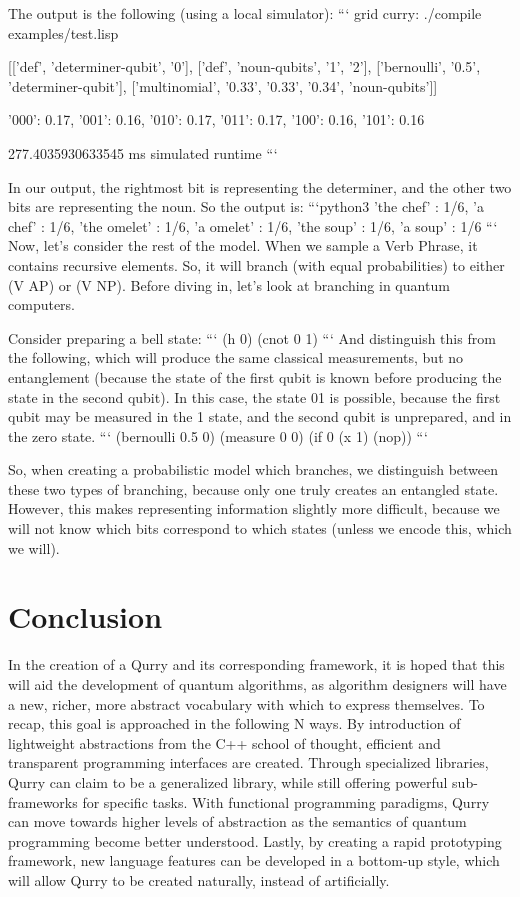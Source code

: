 \documentclass[journal]{article}
\begin{document}
 The output is the following (using a local simulator):
 ```
 grid {curry}: ./compile examples/test.lisp
 
 [['def', 'determiner-qubit', '0'],
  ['def', 'noun-qubits', '1', '2'],
  ['bernoulli', '0.5', 'determiner-qubit'],
  ['multinomial', '0.33', '0.33', '0.34', 'noun-qubits']]
 
 {'000': 0.17, '001': 0.16, '010': 0.17, '011': 0.17, '100': 0.16, '101': 0.16}
 
 277.4035930633545 ms simulated runtime
 ```
 
 In our output, the rightmost bit is representing the determiner, and the other two bits are representing the noun.
 So the output is:
 ```python3
 {'the chef' : 1/6, 'a chef' : 1/6, 'the omelet' : 1/6, 'a omelet' : 1/6, 'the soup' : 1/6, 'a soup' : 1/6}
 ```
 Now, let's consider the rest of the model.
 When we sample a Verb Phrase, it contains recursive elements.
 So, it will branch (with equal probabilities) to either (V AP) or (V NP).
 Before diving in, let's look at branching in quantum computers.
 
 Consider preparing a bell state:
 ```
 (h 0)
 (cnot 0 1)
 ```
 And distinguish this from the following, which will produce the same classical measurements, but no entanglement (because the state of the first qubit is known before producing the state in the second qubit). 
 In this case, the state 01 is possible, because the first qubit may be measured in the 1 state, and the second qubit is unprepared, and in the zero state.
 ```
 (bernoulli 0.5 0)
 (measure 0 0)
 (if 0 (x 1) (nop))
 ```
 
 So, when creating a probabilistic model which branches, we distinguish between these two types of branching, because only one truly creates an entangled state.
 However, this makes representing information slightly more difficult, because we will not know which bits correspond to which states (unless we encode this, which we will).

\section{Conclusion}

In the creation of a Qurry and its corresponding framework, it is hoped that this will aid the development of quantum algorithms, as algorithm designers will have a new, richer, more abstract vocabulary with which to express themselves.
To recap, this goal is approached in the following N ways.
By introduction of lightweight abstractions from the C++ school of thought, efficient and transparent programming interfaces are created.
Through specialized libraries, Qurry can claim to be a generalized library, while still offering powerful sub-frameworks for specific tasks.
With functional programming paradigms, Qurry can move towards higher levels of abstraction as the semantics of quantum programming become better understood.
Lastly, by creating a rapid prototyping framework, new language features can be developed in a bottom-up style, which will allow Qurry to be created naturally, instead of artificially.
\end{document}
